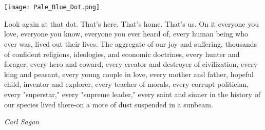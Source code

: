 \chapter*{}
\thispagestyle{plain} \null
\vfill
 \vspace{0.25cm}
	\texttt{[image: Pale\_Blue\_Dot.png]}\par
	\vspace{1cm}
	
\begin{flushright}
Look again at that dot. That's here. That's home. That's us. On it everyone you love, everyone you know, everyone you ever heard of, every human being who ever was, lived out their lives. The aggregate of our joy and suffering, thousands of confident religions, ideologies, and economic doctrines, every hunter and forager, every hero and coward, every creator and destroyer of civilization, every king and peasant, every young couple in love, every mother and father, hopeful child, inventor and explorer, every teacher of morals, every corrupt politician, every "superstar," every "supreme leader," every saint and sinner in the history of our species lived there-on a mote of dust suspended in a sunbeam.

	\textit{Carl Sagan}
	\par\medskip
\end{flushright}
\vfill\vfill